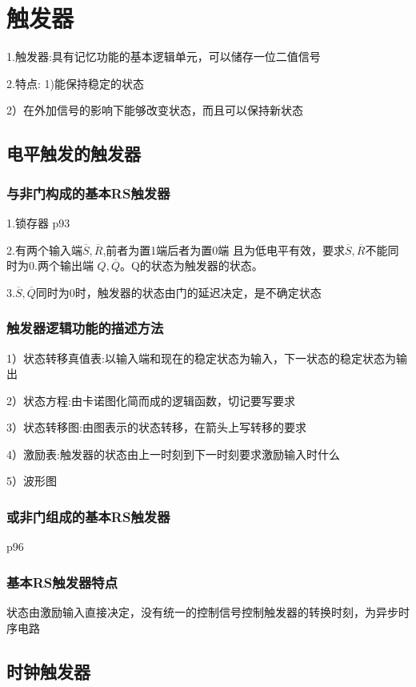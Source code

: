 \documentclass[11pt,twoside,a4paper]{ctexart}
\begin{document}
    \section{触发器}
    1.触发器:具有记忆功能的基本逻辑单元，可以储存一位二值信号

    2.特点: 
     1)能保持稳定的状态

     2）在外加信号的影响下能够改变状态，而且可以保持新状态
    
    \subsection{电平触发的触发器}
    \subsubsection{与非门构成的基本RS触发器}
    1.锁存器 p93

    2.有两个输入端$\overline{S},\overline{R}$,前者为置1端后者为置0端
    且为低电平有效，要求$\overline{S},\overline{R}$不能同时为0.两个输出端
    $Q,\overline{Q}$。Q的状态为触发器的状态。

    3.$\overline{S},\overline{Q}$同时为0时，触发器的状态由门的延迟决定，是不确定状态

    \subsubsection{触发器逻辑功能的描述方法}
    1）状态转移真值表:以输入端和现在的稳定状态为输入，下一状态的稳定状态为输出

    2）状态方程:由卡诺图化简而成的逻辑函数，切记要写要求

    3）状态转移图:由图表示的状态转移，在箭头上写转移的要求

    4）激励表:触发器的状态由上一时刻到下一时刻要求激励输入时什么

    5）波形图
    \subsubsection{或非门组成的基本RS触发器}
    p96

    \subsubsection{基本RS触发器特点}
    状态由激励输入直接决定，没有统一的控制信号控制触发器的转换时刻，为异步时序电路

    \subsection{时钟触发器}
\end{document}
